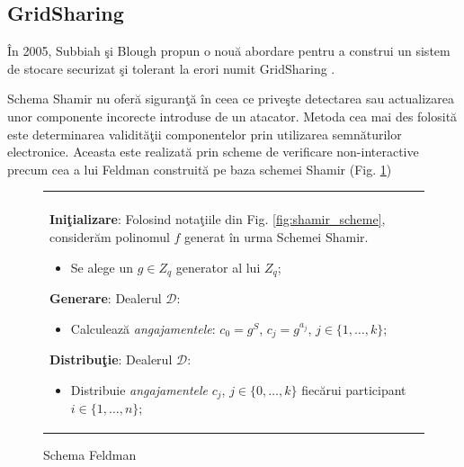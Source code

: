 \documentclass{llncs}
\begin{document}
\subsection{GridSharing} 
\label{sec:desc_gridsharing}

\^{I}n 2005, Subbiah \c{s}i Blough propun o nou\u{a} abordare pentru a construi un sistem de stocare securizat \c{s}i tolerant la erori numit GridSharing \cite{SB:2005}.

Schema Shamir nu ofer\u{a} siguran\c{t}\u{a} \^{i}n ceea ce prive\c{s}te detectarea sau actualizarea unor componente incorecte introduse de un atacator. Metoda cea mai des folosit\u{a} este determinarea validit\u{a}\c{t}ii componentelor prin utilizarea semn\u{a}turilor electronice. Aceasta este realizat\u{a} prin scheme de verificare non-interactive precum cea a lui Feldman construit\u{a} pe baza schemei Shamir \cite{Feldman:1987} (Fig. \ref{fig:feldman_scheme})

\begin{figure}[h!]

\begin{tabular}{|p{\textwidth}|}
\hline

\\
\hspace{.1in}
\textbf{Ini\c{t}ializare}: 
	Folosind nota\c{t}iile din Fig. \ref{fig:shamir_scheme}, consider\u{a}m polinomul $f$ generat \^{i}n urma Schemei Shamir.
	\begin{itemize}
		\item Se alege un $g \in Z_q$ generator al lui $Z_q$;
	\end{itemize}
\medskip

\hspace{.1in}
\textbf{Generare}: Dealerul $\mathcal{D}$:
	\begin{itemize}
		\item Calculeaz\u{a} \textit{angajamentele}: $c_0 = g^S$, $c_j = g^{a_j}$, $j \in \{1,\dots,k\}$;
	\end{itemize}
\medskip

\hspace{.1in}
\textbf{Distribu\c{t}ie}: Dealerul $\mathcal{D}$:
	\begin{itemize}
		\item Distribuie \textit{angajamentele} $c_j$, $j \in \{0,\dots,k\}$ fiec\u{a}rui participant $i\in \{1,\dots,n\}$;
	\end{itemize}

\hspace{.1in}
\\
\hline
\end{tabular}

\caption{Schema Feldman \cite{Feldman:1987}}
\label{fig:feldman_scheme}
\end{figure}
\end{document}
